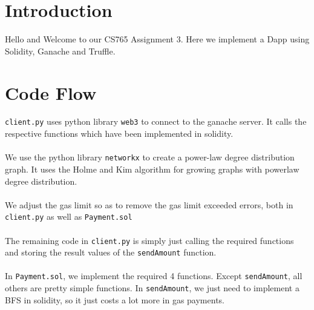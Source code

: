 \documentclass[a4paper,14pt]{article}
\begin{document}

\date{Spring 2023}
\maketitle

\justifying


\justifying

\section*{Introduction}

Hello and Welcome to our CS765 Assignment 3. Here we implement a Dapp using Solidity, Ganache and Truffle.

\section{Code Flow}

\verb|client.py| uses python library \verb|web3| to connect to the ganache server. It calls the respective functions which have been implemented in solidity.\\\\
We use the python library \verb|networkx| to create a power-law degree distribution graph. It uses the Holme and Kim algorithm for growing graphs with powerlaw degree distribution.\\\\
We adjust the gas limit so as to remove the gas limit exceeded errors, both in \verb|client.py| as well as \verb|Payment.sol|\\\\
The remaining code in \verb|client.py| is simply just calling the required functions and storing the result values of the \verb|sendAmount| function.\\\\
In \verb|Payment.sol|, we implement the required 4 functions. Except \verb|sendAmount|, all others are pretty simple functions. In \verb|sendAmount|, we just need to implement a BFS in solidity, so it just costs a lot more in gas payments.
\end{document}
